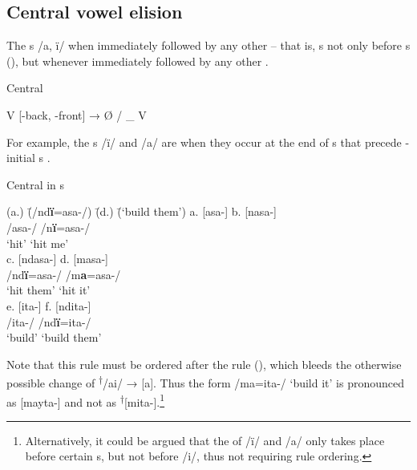 \subsection{Central vowel elision}\label{sec:2.5.5}


The s /a, ï/  when immediately followed by any other  -- that is, s  not only before s (), but whenever immediately followed by any other  .

\ea%
    \label{ex:phon:74}
          Central  

    V [-back, -front] → Ø / \_ V
\z

For example, the s /ï/ and /a/ are  when they occur at the end of  s that precede -initial s .

\ea%
    \label{ex:phon:75}
          Central   in  s\\
\begin{tabbing}    
{(a.)} \= {(/nd\textbf{ï}=asa-/)} \= {(d.)} \= {(‘build them’)}\kill
{a.} \> {[asa-]} \> {b.} \> {[nasa-]}\\
{ } \> {/asa-/} \> { } \> {/n\textbf{ï}=asa-/}\\
{ } \> {‘hit’} \> { } \> {‘hit me’}\\
{c.} \> {[ndasa-]} \> {d.} \> {[masa-]}\\
{ } \> {/nd\textbf{ï}=asa-/} \> { } \> {/m\textbf{a}=asa-/}\\
{ } \> {‘hit them’} \> { } \> {‘hit it’}\\
{e.} \> {[ita-]} \> {f.} \> {[ndita-]}\\
{ } \> {/ita-/} \> { } \> {/nd\textbf{ï}=ita-/}\\
{ } \> ‘build’ \> { } \> {‘build them’}
\end{tabbing}
\z

Note that this rule must be ordered after the  rule (), which bleeds the otherwise possible change of \textsuperscript{†}/ai/ → [a]. Thus the form /ma=ita-/ ‘build it’ is pronounced as [mayta-] and not as \textsuperscript{†}[mita-].\footnote{Alternatively, it could be argued that the  of /ï/ and /a/ only takes place before certain s, but not before /i/, thus not requiring rule ordering.}

